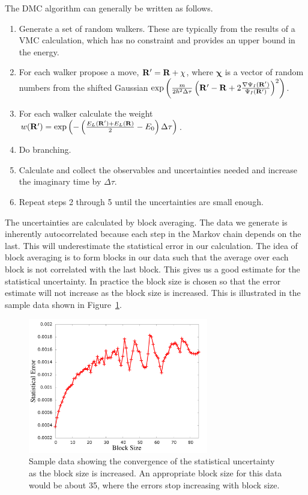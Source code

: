 The DMC algorithm can generally be written as follows.
\begin{enumerate}
   \item Generate a set of random walkers. These are typically from the results of a VMC calculation, which has no constraint and provides an upper bound in the energy.
   \item For each walker propose a move, $\mathbf{R}' = \mathbf{R} + \mathbf{\chi}$, where $\mathbf{\chi}$ is a vector of random numbers from the shifted Gaussian $\exp\left(\frac{m}{2\hbar^2\Delta\tau}\left(\mathbf{R}'-\mathbf{R}+2\frac{\nabla\Psi_I(\mathbf{R}')}{\Psi_I(\mathbf{R}')}\right)^2\right)$.
   \item For each walker calculate the weight $w(\mathbf{R}')=\exp\left(-\left(\frac{E_L(\mathbf{R}')+E_L(\mathbf{R})}{2}-E_0\right)\Delta\tau\right)$.
   \item Do branching.
   \item Calculate and collect the observables and uncertainties needed and increase the imaginary time by $\Delta\tau$.
   \item Repeat steps 2 through 5 until the uncertainties are small enough.
\end{enumerate}

The uncertainties are calculated by block averaging. The data we generate is inherently autocorrelated because each step in the Markov chain depends on the last. This will underestimate the statistical error in our calculation. The idea of block averaging is to form blocks in our data such that the average over each block is not correlated with the last block. This gives us a good estimate for the statistical uncertainty. In practice the block size is chosen so that the error estimate will not increase as the block size is increased. This is illustrated in the sample data shown in Figure~\ref{fig:blockaverage}.
\begin{figure}[h!]
   \centering
   \includegraphics[width=0.7\textwidth]{figures/blockaverage.png}
   \caption{Sample data showing the convergence of the statistical uncertainty as the block size is increased. An appropriate block size for this data would be about 35, where the errors stop increasing with block size.}
   \label{fig:blockaverage}
\end{figure}

